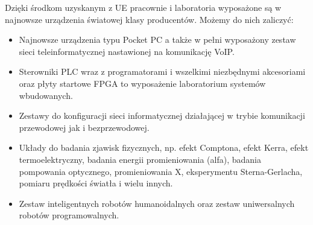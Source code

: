 \documentclass[a4paper,12pt]{article}
\begin{document}
Dzięki środkom uzyskanym z UE pracownie i laboratoria wyposażone są w najnowsze urządzenia światowej
klasy producentów. Możemy do nich zaliczyć:

\begin{itemize}
\item Najnowsze urządzenia typu Pocket PC a także w pełni wyposażony zestaw sieci teleinformatycznej
nastawionej na komunikację VoIP.
\item Sterowniki PLC wraz z programatorami i wszelkimi niezbędnymi akcesoriami oraz płyty startowe FPGA
to wyposażenie laboratorium systemów wbudowanych.
\item Zestawy do konfiguracji sieci informatycznej działającej w trybie komunikacji przewodowej jak i
bezprzewodowej.
\item Układy do badania zjawisk fizycznych, np. efekt Comptona, efekt Kerra, efekt termoelektryczny, badania
energii promieniowania (alfa), badania pompowania optycznego, promieniowania X, eksperymentu
Sterna-Gerlacha, pomiaru prędkości światła i wielu innych.
\item Zestaw inteligentnych robotów humanoidalnych oraz zestaw uniwersalnych robotów programowalnych.
\end{itemize}
\end{document}
